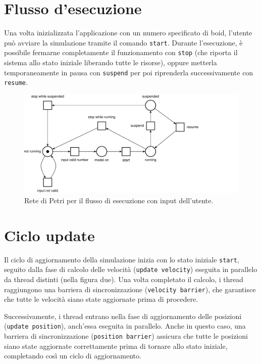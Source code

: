 \documentclass[a4paper,12pt]{report}
\begin{document}
\section{Flusso d'esecuzione}
Una volta inizializzata l'applicazione con un numero specificato di boid, l'utente può avviare la simulazione tramite il comando \texttt{start}. Durante l'esecuzione, è possibile fermarne completamente il funzionamento con \texttt{stop} (che riporta il sistema allo stato iniziale liberando tutte le risorse), oppure metterla temporaneamente in pausa con \texttt{suspend} per poi riprenderla successivamente con \texttt{resume}.
\begin{figure}[h!]
    \centering
    \includegraphics[width=\textwidth]{rete_app_flow.pdf}
    \caption{Rete di Petri per il flusso di esecuzione con input dell'utente.}
    \label{fig:rete_app_flow}
\end{figure}

\section{Ciclo update}
Il ciclo di aggiornamento della simulazione inizia con lo stato iniziale \texttt{start}, seguito dalla fase di calcolo delle velocità (\texttt{update velocity}) eseguita in parallelo da thread distinti (nella figura due). Una volta completato il calcolo, i thread raggiungono una barriera di sincronizzazione (\texttt{velocity barrier}), che garantisce che tutte le velocità siano state aggiornate prima di procedere.

Successivamente, i thread entrano nella fase di aggiornamento delle posizioni (\texttt{update position}), anch'essa eseguita in parallelo. Anche in questo caso, una barriera di sincronizzazione (\texttt{position barrier}) assicura che tutte le posizioni siano state aggiornate correttamente prima di tornare allo stato iniziale, completando così un ciclo di aggiornamento.
\end{document}
